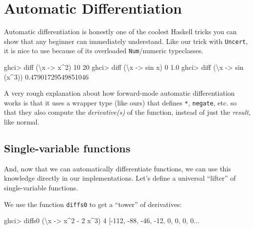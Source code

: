 \documentclass[]{article}
\newenvironment{Shaded}{}{}
\newcommand{\DecValTok}[1]{\textcolor[rgb]{0.25,0.63,0.44}{{#1}}}
\newcommand{\FloatTok}[1]{\textcolor[rgb]{0.25,0.63,0.44}{{#1}}}
\newcommand{\OtherTok}[1]{\textcolor[rgb]{0.00,0.44,0.13}{{#1}}}
\newcommand{\FunctionTok}[1]{\textcolor[rgb]{0.02,0.16,0.49}{{#1}}}
\newcommand{\NormalTok}[1]{{#1}}
\begin{document}
\section{Automatic Differentiation}\label{automatic-differentiation}

Automatic differentiation is honestly one of the coolest Haskell tricks
you can show that any beginner can immediately understand. Like our
trick with \texttt{Uncert}, it is nice to use because of its overloaded
\texttt{Num}/numeric typeclasses.

\begin{Shaded}
\begin{Highlighting}[]
\NormalTok{ghci}\FunctionTok{>} \NormalTok{diff (\textbackslash{}x }\OtherTok{->} \NormalTok{x}\FunctionTok{^}\DecValTok{2}\NormalTok{) }\DecValTok{10}
\DecValTok{20}
\NormalTok{ghci}\FunctionTok{>} \NormalTok{diff (\textbackslash{}x }\OtherTok{->} \NormalTok{sin x) }\DecValTok{0}
\FloatTok{1.0}
\NormalTok{ghci}\FunctionTok{>} \NormalTok{diff (\textbackslash{}x }\OtherTok{->} \NormalTok{sin (x}\FunctionTok{^}\DecValTok{3}\NormalTok{))}
\FloatTok{0.47901729549851046}
\end{Highlighting}
\end{Shaded}

A very rough explanation about how forward-mode automatic
differentiation works is that it uses a wrapper type (like ours) that
defines \texttt{*}, \texttt{negate}, etc. so that they also compute the
\emph{derivative(s)} of the function, instead of just the \emph{result},
like normal.

\subsection{Single-variable functions}\label{single-variable-functions}

And, now that we can automatically differentiate functions, we can use
this knowledge directly in our implementations. Let's define a universal
``lifter'' of single-variable functions.

We use the function \texttt{diffs0} to get a ``tower'' of derivatives:

\begin{Shaded}
\begin{Highlighting}[]
\NormalTok{ghci}\FunctionTok{>} \NormalTok{diffs0 (\textbackslash{}x }\OtherTok{->} \NormalTok{x}\FunctionTok{^}\DecValTok{2} \FunctionTok{-} \DecValTok{2} \NormalTok{x}\FunctionTok{^}\DecValTok{3}\NormalTok{) }\DecValTok{4}
\NormalTok{[}\FunctionTok{-}\DecValTok{112}\NormalTok{, }\FunctionTok{-}\DecValTok{88}\NormalTok{, }\FunctionTok{-}\DecValTok{46}\NormalTok{, }\FunctionTok{-}\DecValTok{12}\NormalTok{, }\DecValTok{0}\NormalTok{, }\DecValTok{0}\NormalTok{, }\DecValTok{0}\NormalTok{, }\DecValTok{0}\FunctionTok{...}
\end{Highlighting}
\end{Shaded}
\end{document}
